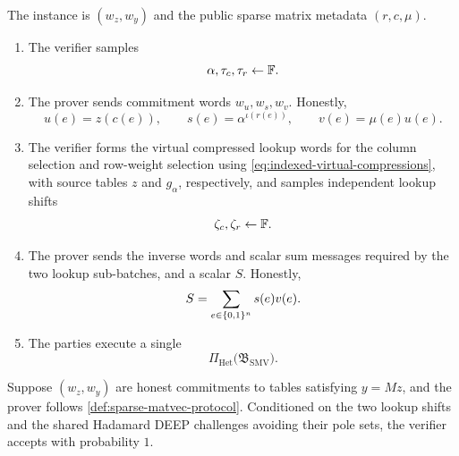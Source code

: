 \begin{definition}
\label{def:sparse-matvec-protocol}
The instance is $(w_z,w_y)$ and the public sparse matrix metadata $(r,c,\mu)$.
\begin{enumerate}[label=\textnormal{\arabic*.},leftmargin=*]
  \item The verifier samples
  \begin{equation}
    \alpha,\tau_c,\tau_r\leftarrow\mathbb{F}.
    \label{eq:sparse-first-challenges}
  \end{equation}
  \item The prover sends commitment words $w_u,w_s,w_v$.  Honestly,
  \begin{equation}
    u(e)=z(c(e)),
    \qquad
    s(e)=\alpha^{\iota(r(e))},
    \qquad
    v(e)=\mu(e)u(e).
    \label{eq:sparse-honest-auxiliaries}
  \end{equation}
  \item The verifier forms the virtual compressed lookup words for the column selection and row-weight selection using \eqref{eq:indexed-virtual-compressions}, with source tables $z$ and $g_\alpha$, respectively, and samples independent lookup shifts
  \begin{equation}
    \zeta_c,\zeta_r\leftarrow\mathbb{F}.
    \label{eq:sparse-lookup-shifts}
  \end{equation}
  \item The prover sends the inverse words and scalar sum messages required by the two lookup sub-batches, and a scalar $S$.  Honestly,
  \begin{equation}
    S=\sum_{e\in\{0,1\}^n}s(e)v(e).
    \label{eq:sparse-honest-S}
  \end{equation}
  \item The parties execute a single
  \begin{equation}
    \Pi_{\mathrm{Het}}\bigl(\mathfrak B_{\mathrm{SMV}}\bigr).
    \label{eq:sparse-run-one-batch}
  \end{equation}
\end{enumerate}
\end{definition}

\begin{theorem}
\label{thm:sparse-matvec-completeness}
Suppose $(w_z,w_y)$ are honest commitments to tables satisfying $y=Mz$, and the prover follows \cref{def:sparse-matvec-protocol}.  Conditioned on the two lookup shifts and the shared Hadamard DEEP challenges avoiding their pole sets, the verifier accepts with probability $1$.
\end{theorem}

